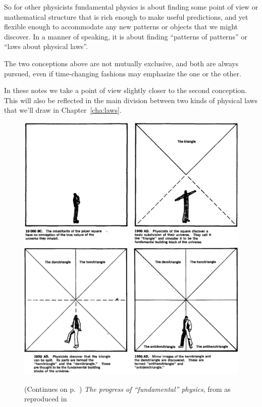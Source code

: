 \documentclass[a4paper,12pt,%
onecolumn,oneside,%
british%
]{memoir}
\renewcommand*{\|}[1][]{\nonscript\:#1\vert\nonscript\:\mathopen{}}
\newcommand*{\chap}{Chapter}%
\begin{document}
So for other physicists fundamental physics is about finding some point of view or mathematical structure that is rich enough to make useful predictions, and yet flexible enough to accommodate any new patterns or objects that we might discover. In a manner of speaking, it is about finding \enquote{patterns of patterns} or \enquote{laws about physical laws}.

The two conceptions above are not mutually exclusive, and both are always pursued, even if time-changing fashions may emphasize the one or the other.

In these notes we take a point of view slightly closer to the second conception. This will also be reflected in the main division between two kinds of physical laws that we'll draw in \chap~\ref{cha:laws}.


\begin{figure}[p]
  \centering
  \includegraphics[width=1.2\textwidth]{images/chew1.png}
  \\[1em]  \includegraphics[width=1.2\textwidth]{images/chew2.png}
  \caption{(Continues on p.~\pageref{fig:chew2}) \emph{The progress of \enquote{fundamental} physics}, from \cites{chew1970} as reproduced in \cites{truesdell1984_r1987}}
  \label{fig:chew1}
\end{figure}
\end{document}
